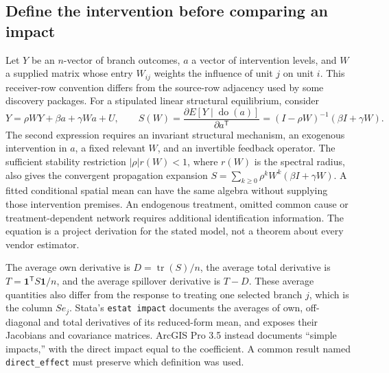 \subsection{Define the intervention before comparing an impact}
\label{exec20:network-target}

Let $Y$ be an $n$-vector of branch outcomes, $a$ a vector of intervention levels,
and $W$ a supplied matrix whose entry $W_{ij}$ weights the influence of unit $j$
on unit $i$. This receiver-row convention differs from the source-row adjacency
used by some discovery packages. For a stipulated linear structural equilibrium,
consider
\begin{equation}
 Y=\rho WY+\beta a+\gamma Wa+U,
 \qquad
 S(W)=\frac{\partial E[Y\mid\operatorname{do}(a)]}{\partial a^{\mathsf T}}
      =(I-\rho W)^{-1}(\beta I+\gamma W).
 \label{exec20:network-response}
\end{equation}
The second expression requires an invariant structural mechanism, an exogenous
intervention in $a$, a fixed relevant $W$, and an invertible feedback operator.
The sufficient stability restriction $|\rho|r(W)<1$, where $r(W)$ is the
spectral radius, also gives the convergent propagation expansion
$S=\sum_{k\geq0}\rho^kW^k(\beta I+\gamma W)$. A fitted conditional spatial
mean can have the same algebra without supplying those intervention premises.
An endogenous treatment, omitted common cause or treatment-dependent network
requires additional identification information. The equation is a project
derivation for the stated model, not a theorem about every vendor estimator.
\citep{exec20_network_reference}

The average own derivative is $D=\operatorname{tr}(S)/n$, the average total
derivative is $T=\boldsymbol{1}^{\mathsf T}S\boldsymbol{1}/n$, and the
average spillover derivative is $T-D$. These average quantities also differ from
the response to treating one selected branch $j$, which is the column $S e_j$.
Stata's \texttt{estat impact} documents the averages of own, off-diagonal and
total derivatives of its reduced-form mean, and exposes their Jacobians and
covariance matrices. ArcGIS Pro 3.5 instead documents ``simple impacts,'' with
the direct impact equal to the coefficient. A common result named
\texttt{direct\_effect} must preserve which definition was used.
\citep{exec20_network_stata_impacts,exec20_network_arcgis_method}

